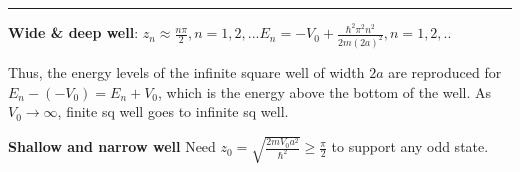 

\hrule height 0.3pt \thinspace

\textbf{Wide \& deep well}: $z_n \approx \frac{n \pi}{2}, n = 1, 2, .. . E_n = -V_0 + \frac{\hbar^2 \pi^2 n^2}{2m(2a)^2}, n = 1, 2, ..$

Thus, the energy levels of the infinite square well of width $2a$ are reproduced for $E_n - (-V_0) = E_n + V_0$, which is the energy above the bottom of the well. As $V_0 \rightarrow \infty$, finite sq well goes to infinite sq well.




\textbf{Shallow and narrow well}
Need $z_0 = \sqrt{\frac{2mV_0 a^2}{\hbar^2}} \geq \frac{\pi}{2}$ to support any odd state.


